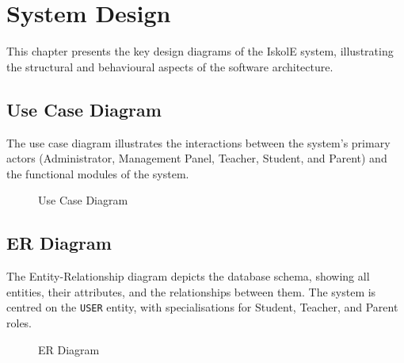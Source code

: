 \documentclass[12pt, a4paper]{report}
\begin{document}
\chapter{System Design}

This chapter presents the key design diagrams of the IskolE system, illustrating the structural and behavioural aspects of the software architecture.

\section{Use Case Diagram}

The use case diagram illustrates the interactions between the system's primary actors (Administrator, Management Panel, Teacher, Student, and Parent) and the functional modules of the system.

\begin{figure}[H]
    \centering
    \caption{Use Case Diagram}
    \label{fig:use-case}
\end{figure}

\section{ER Diagram}

The Entity-Relationship diagram depicts the database schema, showing all entities, their attributes, and the relationships between them. The system is centred on the \texttt{USER} entity, with specialisations for Student, Teacher, and Parent roles.

\begin{figure}[H]
    \centering
    \caption{ER Diagram}
    \label{fig:er-diagram}
\end{figure}
\end{document}
